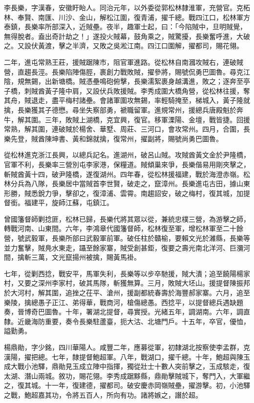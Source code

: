 \begin{pinyinscope}
李長樂，字漢春，安徽盱眙人。同治元年，以外委從郭松林隸淮軍，充營官。克柘林、奉賢、南匯、川沙、金山，解松江圍，復青浦，擢千總。戰四江口，松林軍方泰鎮，長樂率所部深入，近賊壘。夜半，趣軍士起，曰：「今陷賊中，旦明賊覺，無得脫者。盍出奇計劫之！」遂投火賊幕，鼓角乘之，賊驚擾，長樂奮呼進，大破之。又設伏黃渡，擊之半濟，又敗之吳淞江南。四江口圍解，擢都司，賜花翎。

二年，進屯常熟王莊，援賊踞陳市，阻官軍進路。從松林自南漍攻賊右，連破賊營，直趨長涇。長樂陷陣傷脛，裹創力戰敗賊，擢參將，賜號侃勇巴圖魯。尋克江陰，規無錫，出新塘橋。賊憑壘鳴砲俯擊，長樂濡絮裹身越溝進，敗之；逐奔至亭子橋，刺賊酋黃子隆中肩，又設伏兵敗援賊。李秀成圍大橋角營，從松林往援，奪其舟，賊退走，盡平梅村諸壘。會諸軍圍攻無錫，率輕騎掩至，梯城入，黃子隆就擒，長樂獲其子德懋。尋坐失察部勇，褫職留軍。進規常州，援總兵唐殿魁於奔牛，解其圍。三年，敗賊上湖橋，克宜興，復官。移軍溧陽、金壇，戰皆捷。回援常熟，解其圍，連破賊於楊舍、華墅、周莊、三河口，會攻常州。四月，合圍，長樂先登，賊酋陳坤書、黃和錦就擒，復常州，擢副將，賜號尚勇巴圖魯。

從松林進克浙江長興，以總兵記名。進湖州，破呂山賊。攻賊酋黃文金於尹隆橋，官軍不利，長樂率三營別屯李家港，保糧道。賊傾巢來爭，長樂偕易用剛夾擊之，斬賊酋黃十四，破尹隆橋，遂復湖州。四年春，從松林援福建，戰於海澄赤嶺。松林分兵為八隊，長樂居中當賊首李世賢，破走之，竄漳州。長樂進屯古田，據山東形勝，賊悉銳力爭，擊卻之，復漳浦、雲霄。南趨詔安，破之梅村，復其城，加提督銜。福建平，旋師江蘇，屯鎮江。

曾國籓督師剿捻匪，松林已歸，長樂代將其眾以從，兼統忠樸三營，為游擊之師，轉戰河南、山東間。六年，李鴻章代國籓督師，松林復至軍，增松林軍至二十餘營，號武毅軍，長樂所部曰武毅軍前軍。破任柱於贛榆，要賴文光於濰縣，長樂等並力奮擊，賊鳧水東走，躡至餘家寨，賊受創甚鉅，復要之壽光南北洋河、巨瀰河間，擒斬三萬，文光竄揚州被擒，賜黃馬褂。

七年，從剿西捻，戰安平，馬軍失利，長樂等以步卒馳援，賊大潰；追至饒陽楊家村，又要之深州李家村，破其馬隊，斬獲無算。三月，敗賊大坯山。援提督陳振邦於大河村，解其圍，追挫之茌平、滄州，援副都統春壽於海豐郝家寨。六月，追至樂陵，擒總愚子正江、弟得華，戰商河，槍傷總愚。西捻平，以提督總兵遇缺題奏，晉博奇巴圖魯。十年，署湖北提督，尋實授。光緒五年，調湖南。六年，調直隸。近畿海防重要，奏令長樂駐蘆臺，扼大沽、北塘門戶。十五年，卒官，優恤，謚勤勇。

楊鼎勛，字少銘，四川華陽人。咸豐二年，應募從軍，初隸湖北按察使李孟群，克漢陽，擢把總。七年，隸提督鮑超軍。八年，戰湖口，擢千總。十年，鮑超與陳玉成大戰小池驛，鼎勛見玉成立陣中指揮，獨從壯士十數人突前擊之，玉成駭走，復太湖、潛山兩城。敘功，賜花翎。李秀成踞黟縣，鼎勛擊賊城下，奪門入，大軍繼之，復其城。十一年，復建德，擢都司。破安慶赤岡嶺賊壘，擢游擊。初，小池驛之戰，鮑超嘉其功，令將五百人，所向有功。諸將嫉之，譖於超。


\end{pinyinscope}
